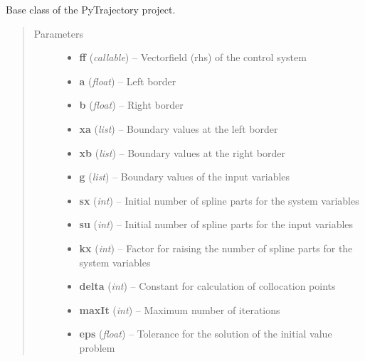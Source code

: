 \documentclass[letterpaper,10pt,english]{sphinxmanual}
\begin{document}
\begin{fulllineitems}
\label{pytrajectory:pytrajectory.trajectory.Trajectory}
Base class of the PyTrajectory project.
\begin{quote}\begin{description}
\item[{Parameters}] \leavevmode\begin{itemize}
\item {} 
\textbf{ff} (\emph{callable}) -- Vectorfield (rhs) of the control system

\item {} 
\textbf{a} (\emph{float}) -- Left border

\item {} 
\textbf{b} (\emph{float}) -- Right border

\item {} 
\textbf{xa} (\emph{list}) -- Boundary values at the left border

\item {} 
\textbf{xb} (\emph{list}) -- Boundary values at the right border

\item {} 
\textbf{g} (\emph{list}) -- Boundary values of the input variables

\item {} 
\textbf{sx} (\emph{int}) -- Initial number of spline parts for the system variables

\item {} 
\textbf{su} (\emph{int}) -- Initial number of spline parts for the input variables

\item {} 
\textbf{kx} (\emph{int}) -- Factor for raising the number of spline parts for the system variables

\item {} 
\textbf{delta} (\emph{int}) -- Constant for calculation of collocation points

\item {} 
\textbf{maxIt} (\emph{int}) -- Maximum number of iterations

\item {} 
\textbf{eps} (\emph{float}) -- Tolerance for the solution of the initial value problem


\end{itemize}
\end{description}
\end{quote}
\end{fulllineitems}
\end{document}
